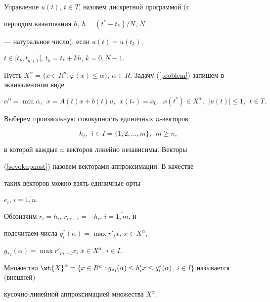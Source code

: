 Управление $u(t)$, $t\in T$, назовем дискретной программой (с


периодом квантования $h$, $h=(t^*-t_*)/N$, $N$


--- натуральное число), если $u(t)=u(t_k)$,


$t\in [t_k,t_{k+1}[$, $t_k=t_*+kh$, $k=\overline{0,N-1}$.





Пусть $X^\alpha=\{x\in R^n:\varphi(x)\leq\alpha\}$, $\alpha\in


R$. Задачу (\ref{problem}) запишем в эквивалентном виде


\begin{equation}\label{ekviv-problem}


\alpha^0=\min\alpha,\ \ \Dot{x}=A(t)x+b(t)u,


\ \ x(t_*)=x_0,\ \ x(t^*)\in X^\alpha,\ \ |u(t)|\leq1,\ \ t\in T.


\end{equation}





Выберем произвольную совокупность единичных $n$-векторов


\begin{equation}\label{sovokupnost}


h_i,\ \ i\in I=\{1,2,\dotsc,m\},\ \ m\geq n,


\end{equation}


в которой каждые $n$ векторов линейно независимы. Векторы


(\ref{sovokupnost}) назовем векторами аппроксимации. В качестве


таких векторов можно взять единичные орты


$e_i$, $i=\overline{1,n}$.





Обозначим $r_i=h_i$, $r_{m+i}=-h_i$, $i=\overline{1,m}$, и


подсчитаем числа $g^*_i(\alpha)=\max r'_ix$, $x\in X^\alpha$,


${g_*}_i(\alpha)=\max r'_{m+i}x$, $x\in X^\alpha$, $i\in I$.





Множество $\wt{X}^\alpha=\{x\in R^n:{g_*}_i(\alpha)\leq


h'_ix\leq g^*_i(\alpha)$, $i\in I\}$ называется (внешней)


кусочно-линейной аппроксимацией множества $X^\alpha$.





